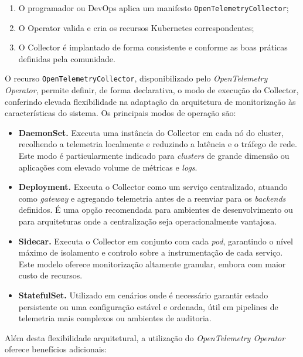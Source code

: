 \begin{enumerate}
\item O programador ou DevOps aplica um manifesto \texttt{OpenTelemetryCollector};
\item O Operator valida e cria os recursos Kubernetes correspondentes;
\item O Collector é implantado de forma consistente e conforme as boas práticas definidas pela comunidade.
\end{enumerate}


O recurso \texttt{OpenTelemetryCollector}, disponibilizado pelo \textit{OpenTelemetry Operator}, permite definir, de forma declarativa, o modo de execução do Collector, conferindo elevada flexibilidade na adaptação da arquitetura de monitorização às características do sistema. Os principais modos de operação são:

\begin{itemize}
    \item \textbf{DaemonSet.} Executa uma instância do Collector em cada nó do cluster, recolhendo a telemetria localmente e reduzindo a latência e o tráfego de rede. Este modo é particularmente indicado para \textit{clusters} de grande dimensão ou aplicações com elevado volume de métricas e \textit{logs}.

    \item \textbf{Deployment.} Executa o Collector como um serviço centralizado, atuando como \textit{gateway} e agregando telemetria antes de a reenviar para os \textit{backends} definidos. É uma opção recomendada para ambientes de desenvolvimento ou para arquiteturas onde a centralização seja operacionalmente vantajosa.

    \item \textbf{Sidecar.} Executa o Collector em conjunto com cada \textit{pod}, garantindo o nível máximo de isolamento e controlo sobre a instrumentação de cada serviço. Este modelo oferece monitorização altamente granular, embora com maior custo de recursos.

    \item \textbf{StatefulSet.} Utilizado em cenários onde é necessário garantir estado persistente ou uma configuração estável e ordenada, útil em pipelines de telemetria mais complexos ou ambientes de auditoria.
\end{itemize}

Além desta flexibilidade arquitetural, a utilização do \textit{OpenTelemetry Operator} oferece benefícios adicionais:


